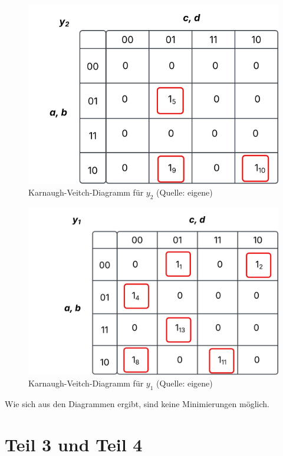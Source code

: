 \begin{figure}
    \centering
    \includegraphics[scale=0.5]{aufgabe 2/img/kv_y2}
    \caption{Karnaugh-Veitch-Diagramm für $y_2$ (Quelle: eigene)}
    \label{fig:kv_y2}
\end{figure}

\begin{figure}
    \centering
    \includegraphics[scale=0.5]{aufgabe 2/img/kv_y1.svg}
    \caption{Karnaugh-Veitch-Diagramm für $y_1$ (Quelle: eigene)}
    \label{fig:kv_y1}
\end{figure}

\noindent
Wie sich aus den Diagrammen ergibt, sind keine Minimierungen möglich.

\section{Teil 3 und Teil 4}

